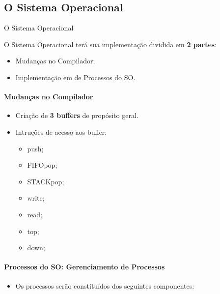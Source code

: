 \documentclass[aspectratio=169]{beamer}
\begin{document}
	\subsection{O Sistema Operacional}
	\begin{frame}{O Sistema Operacional}
		\only<1>
		{
			O Sistema Operacional terá sua implementação dividida em \textbf{2 partes}:
			
			\begin{itemize}
				\item Mudanças no Compilador;
			
			\vspace{0.5cm}
			
				\item Implementação em de Processos do SO.
			\end{itemize}
		}
		{
			\framesubtitle{Mudanças no Compilador}
			\begin{itemize}
				
				\item Criação de \textbf{3 buffers} de propósito geral.
				
				\vspace{0.5cm}
				
				\item Intruções de acesso aos buffer: 
				\begin{itemize}
					\item push;
					\vspace{0.2cm}
					\item FIFOpop;
					\vspace{0.2cm}
					\item STACKpop;
					\vspace{0.2cm}
					\item write;
					\vspace{0.2cm}
					\item read;
					\vspace{0.2cm}
					\item top;
					\vspace{0.2cm}
					\item down; 
				\end{itemize}
			
			\end{itemize}			
		}
		{
			\framesubtitle{Processos do SO: Gerenciamento de Processos}
			\begin{itemize}
				
				\item Os processos serão constituídos dos seguintes componentes:
				

\end{itemize}}
\end{frame}
\end{document}
